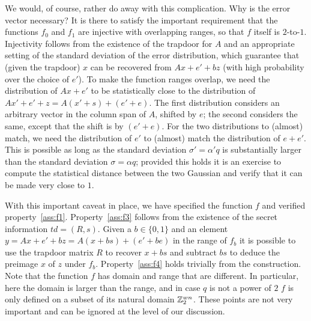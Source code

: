 We would, of course, rather do away with this complication. Why is the error vector necessary? It is there to satisfy the important requirement that the functions $f_0$ and $f_1$ are injective with overlapping ranges, so that $f$ itself is $2$-to-$1$. Injectivity follows from the existence of the trapdoor for $A$ and an appropriate setting of the standard deviation of the error distribution, which guarantee that (given the trapdoor) $x$ can  be recovered from $Ax+e'+bz$ (with high probability over the choice of $e'$). To make the function ranges overlap, we need the distribution of $Ax+e'$ to be statistically close to the distribution of $Ax'+e'+z = A(x'+s)+(e'+e)$. The first distribution considers an arbitrary vector in the column span of $A$, shifted by $e$; the second considers the same, except that the shift is by $(e'+e)$. For the two distributions to (almost) match, we need the distribution of $e'$ to (almost) match the distribution of $e+e'$. This is possible as long as the standard deviation $\sigma'=\alpha'q$ is substantially larger than the standard deviation $\sigma=\alpha q$; provided this holds it is an exercise to compute the statistical distance between the two Gaussian and verify that it can be made very close to $1$. 

With this important caveat in place, we have specified the function $f$ and verified property~\ref{ass:f1}. Property~\ref{ass:f3} follows from the existence of the secret information $td=(R,s)$. Given a $b\in\{0,1\}$ and an element $y=Ax+e'+bz = A(x+bs)+(e'+be)$ in the range of $f_b$  it is possible to use the trapdoor matrix $R$ to recover $x+bs$ and subtract $bs$ to deduce the preimage $x$ of $z$ under $f_b$. Property~\ref{ass:f4} holds trivially from the construction. Note that the function $f$ has domain and range that are different. In particular, here the domain is larger than the range, and in case $q$ is not a power of $2$ $f$ is only defined on a subset of its natural domain $\mathbb{Z}_2^{wn}$. These points are not very important and can be ignored at the level of our discussion. 

